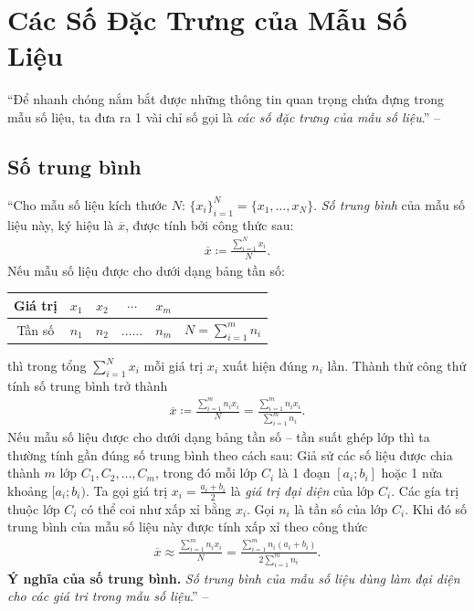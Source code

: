 \documentclass[oneside]{book}
\numberwithin{equation}{section}
\begin{document}
\section{Các Số Đặc Trưng của Mẫu Số Liệu}
``Để nhanh chóng nắm bắt được những thông tin quan trọng chứa đựng trong mẫu số liệu, ta đưa ra 1 vài chỉ số gọi là \textit{các số đặc trưng của mẫu số liệu}.'' -- \cite[p. 69]{TL_chuyen_Toan_Dai_So_Giai_Tich_11}

\subsection{Số trung bình}
``Cho mẫu số liệu kích thước $N$: $\{x_i\}_{i=1}^N = \{x_1,\ldots,x_N\}$. \textit{Số trung bình} của mẫu số liệu này, ký hiệu là $\overline{x}$, được tính bởi công thức sau:
\begin{align}
	\overline{x}\coloneqq\frac{\sum_{i=1}^N x_i}{N}.
\end{align}
Nếu mẫu số liệu được cho dưới dạng bảng tần số:

\begin{table}[H]
	\centering
	\begin{tabular}{|c|c|c|c|c|c|}
		\hline
		Giá trị & $x_1$ & $x_2$ & $\cdots$ & $x_m$ &  \\
		\hline
		Tần số & $n_1$ & $n_2$ & $\ldots\ldots$ & $n_m$ & $N = \sum_{i=1}^m n_i$ \\
		\hline
	\end{tabular}
\end{table}
\noindent thì trong tổng $\sum_{i=1}^N x_i$ mỗi giá trị $x_i$ xuất hiện đúng $n_i$ lần. Thành thử công thứ tính số trung bình trở thành
\begin{align*}
	\overline{x}\coloneqq\frac{\sum_{i=1}^m n_ix_i}{N} = \frac{\sum_{i=1}^m n_ix_i}{\sum_{i=1}^m n_i}.
\end{align*}
Nếu mẫu số liệu được cho dưới dạng bảng tần số -- tần suất ghép lớp thì ta thường tính gần đúng số trung bình theo cách sau: Giả sử các số liệu được chia thành $m$ lớp $C_1,C_2,\ldots,C_m$, trong đó mỗi lớp $C_i$ là 1 đoạn $[a_i;b_i]$ hoặc 1 nửa khoảng $[a_i;b_i)$. Ta gọi giá trị $x_i = \frac{a_i + b_i}{2}$ là \textit{giá trị đại diện} của lớp $C_i$. Các gía trị thuộc lớp $C_i$ có thể coi như xấp xỉ bằng $x_i$. Gọi $n_i$ là tần số của lớp $C_i$. Khi đó số trung bình của mẫu số liệu này được tính xấp xỉ theo công thức
\begin{align*}
	\overline{x}\approx\frac{\sum_{i=1}^m n_ix_i}{N} = \frac{\sum_{i=1}^m n_i(a_i + b_i)}{2\sum_{i=1}^m n_i}.
\end{align*}
\textbf{Ý nghĩa của số trung bình.} \textit{Số trung bình của mẫu số liệu dùng làm đại diện cho các giá tri trong mẫu số liệu}.'' -- \cite[pp. 69--70]{TL_chuyen_Toan_Dai_So_Giai_Tich_11}
\end{document}
